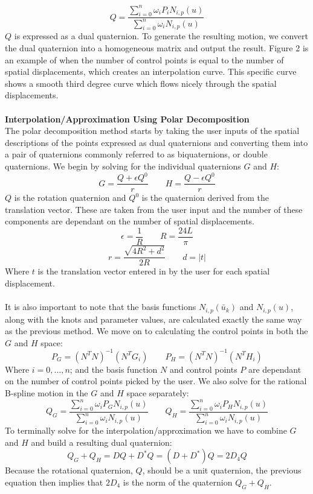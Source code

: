 \documentclass[11pt]{article}
\begin{document}
$$ Q = \frac{\sum^n_{i=0} \omega_i P_i N_{i,p}(u)}{\sum^n_{i=0} \omega_i N_{i,p}(u)}$$
$Q$ is expressed as a dual quaternion. To generate the resulting motion, we convert the dual quaternion into a homogeneous matrix and output the result. Figure 2 is an example of when the number of control points is equal to the number of spatial displacements, which creates an interpolation curve. This specific curve shows a smooth third degree curve which flows nicely through the spatial displacements.
\\
\\
\textbf{\large{Interpolation/Approximation Using Polar Decomposition}}
\\
The polar decomposition method starts by taking the user inputs of the spatial descriptions of the points expressed as dual quaternions and converting them into a pair of quaternions commonly referred to as biquaternions, or double quaternions. We begin by solving for the individual quaternions $G$ and $H$:
$$ G = \frac{Q + \epsilon Q^0}{r} \qquad H = \frac{Q - \epsilon Q^0}{r}$$
$Q$ is the rotation quaternion and $Q^0$ is the quaternion derived from the translation vector. These are taken from the user input and the number of these components are dependant on the number of spatial displacements.
$$ \epsilon = \frac{1}{R} \qquad R = \frac{24L}{\pi} $$
$$ r = \frac{\sqrt{4R^2+d^2}}{2R} \qquad d = |t| $$
Where $t$ is the translation vector entered in by the user for each spatial displacement.
\\
\\
It is also important to note that the basis functions $N_{i,p}(\bar{u}_k)$ and $N_{i,p}(u)$, along with the knots and parameter values, are calculated exactly the same way as the previous method. We move on to calculating the control points in both the $G$ and $H$ space:
$$ P_G = (N^T N)^{-1}( N^TG_i) \qquad P_H = (N^T N)^{-1}( N^TH_i) $$
Where $i = 0,\ldots, n$; and the basis function $N$ and control points $P$ are dependant on the number of control points picked by the user. We also solve for the rational B-spline motion in the $G$ and $H$ space separately:
$$ Q_G = \frac{\sum^n_{i=0} \omega_i P_G N_{i,p}(u)}{\sum^n_{i=0} \omega_i N_{i,p}(u)} \qquad  Q_H = \frac{\sum^n_{i=0} \omega_i P_H N_{i,p}(u)}{\sum^n_{i=0} \omega_i N_{i,p}(u)}$$
To terminally solve for the interpolation/approximation we have to combine $G$ and $H$ and build a resulting dual quaternion:
$$Q_G+Q_H=DQ+D^*Q=(D+D^*)Q=2D_4Q$$
Because the rotational quaternion, $Q$, should be a unit quaternion, the previous equation then implies that $2D_4$ is the norm of the quaternion $Q_G+Q_H$.
\end{document}
